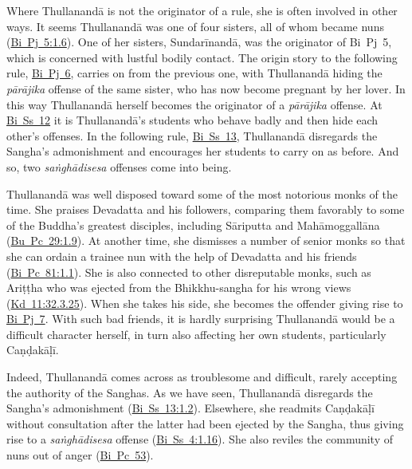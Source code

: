 \documentclass[12pt,openany]{book}%
\begin{document}
Where \textsanskrit{Thullanandā} is not the originator of a rule, she is often involved in other ways. It seems \textsanskrit{Thullanandā} was one of four sisters, all of whom became nuns (\href{https://suttacentral.net/pli-tv-bi-vb-pj5/en/brahmali\#1.6}{Bi~Pj~5:1.6}). One of her sisters, \textsanskrit{Sundarīnandā}, was the originator of Bi Pj 5, which is concerned with lustful bodily contact. The origin story to the following rule, \href{https://suttacentral.net/pli-tv-bi-vb-pj6/en/brahmali\#1.2}{Bi~Pj~6}, carries on from the previous one, with \textsanskrit{Thullanandā} hiding the \textit{\textsanskrit{pārājika}} offense of the same sister, who has now become pregnant by her lover. In this way \textsanskrit{Thullanandā} herself becomes the originator of a \textit{\textsanskrit{pārājika}} offense. At \href{https://suttacentral.net/pli-tv-bi-vb-ss12/en/brahmali\#1.2}{Bi~Ss~12} it is \textsanskrit{Thullanandā}’s students who behave badly and then hide each other’s offenses. In the following rule, \href{https://suttacentral.net/pli-tv-bi-vb-ss13/en/brahmali\#1.2}{Bi~Ss~13}, \textsanskrit{Thullanandā} disregards the Sangha’s admonishment and encourages her students to carry on as before. And so, two \textit{\textsanskrit{saṅghādisesa}} offenses come into being.

\textsanskrit{Thullanandā} was well disposed toward some of the most notorious monks of the time. She praises Devadatta and his followers, comparing them favorably to some of the Buddha’s greatest disciples, including \textsanskrit{Sāriputta} and \textsanskrit{Mahāmoggallāna} (\href{https://suttacentral.net/pli-tv-bu-vb-pc29/en/brahmali\#1.9}{Bu~Pc~29:1.9}). At another time, she dismisses a number of senior monks so that she can ordain a trainee nun with the help of Devadatta and his friends (\href{https://suttacentral.net/pli-tv-bi-vb-pc81/en/brahmali\#1.1}{Bi~Pc~81:1.1}). She is also connected to other disreputable monks, such as \textsanskrit{Ariṭṭha} who was ejected from the Bhikkhu-sangha for his wrong views (\href{https://suttacentral.net/pli-tv-kd11/en/brahmali\#32.3.25}{Kd~11:32.3.25}). When she takes his side, she becomes the offender giving rise to \href{https://suttacentral.net/pli-tv-bi-vb-pj7/en/brahmali\#1.1}{Bi~Pj~7}. With such bad friends, it is hardly surprising \textsanskrit{Thullanandā} would be a difficult character herself, in turn also affecting her own students, particularly \textsanskrit{Caṇḍakāḷī}.

Indeed, \textsanskrit{Thullanandā} comes across as troublesome and difficult, rarely accepting the authority of the Sanghas. As we have seen, \textsanskrit{Thullanandā} disregards the Sangha’s admonishment (\href{https://suttacentral.net/pli-tv-bi-vb-ss13/en/brahmali\#1.2}{Bi~Ss~13:1.2}). Elsewhere, she readmits \textsanskrit{Caṇḍakāḷī} without consultation after the latter had been ejected by the Sangha, thus giving rise to a \textit{\textsanskrit{saṅghādisesa}} offense (\href{https://suttacentral.net/pli-tv-bi-vb-ss4/en/brahmali\#1.16}{Bi~Ss~4:1.16}). She also reviles the community of nuns out of anger (\href{https://suttacentral.net/pli-tv-bi-vb-pc53/en/brahmali\#1.18}{Bi~Pc~53}).
\end{document}
